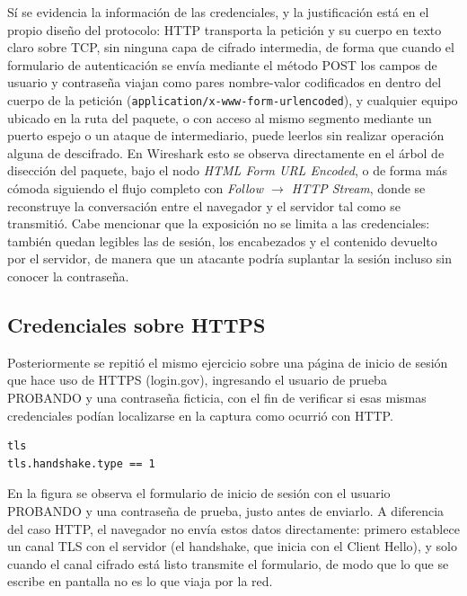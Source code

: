 \begin{respuesta}
Sí se evidencia la información de las credenciales, y la justificación está en el propio diseño del protocolo: HTTP transporta la petición y su cuerpo en texto claro sobre TCP, sin ninguna capa de cifrado intermedia, de forma que cuando el formulario de autenticación se envía mediante el método POST los campos de usuario y contraseña viajan como pares nombre-valor codificados en  dentro del cuerpo de la petición (\texttt{application/x-www-form-urlencoded}), y cualquier equipo ubicado en la ruta del paquete, o con acceso al mismo segmento mediante un puerto espejo o un ataque de intermediario, puede leerlos sin realizar operación alguna de descifrado. En Wireshark esto se observa directamente en el árbol de disección del paquete, bajo el nodo \emph{HTML Form URL Encoded}, o de forma más cómoda siguiendo el flujo completo con \emph{Follow $\rightarrow$ HTTP Stream}, donde se reconstruye la conversación entre el navegador y el servidor tal como se transmitió. Cabe mencionar que la exposición no se limita a las credenciales: también quedan legibles las  de sesión, los encabezados y el contenido devuelto por el servidor, de manera que un atacante podría suplantar la sesión incluso sin conocer la contraseña.
\end{respuesta}

\subsection{Credenciales sobre HTTPS}

Posteriormente se repitió el mismo ejercicio sobre una página de inicio de sesión que hace uso de HTTPS (login.gov), ingresando el usuario de prueba PROBANDO y una contraseña ficticia, con el fin de verificar si esas mismas credenciales podían localizarse en la captura como ocurrió con HTTP.

\begin{lstlisting}
tls
tls.handshake.type == 1
\end{lstlisting}


\begin{analisis}
En la figura se observa el formulario de inicio de sesión con el usuario PROBANDO y una contraseña de prueba, justo antes de enviarlo. A diferencia del caso HTTP, el navegador no envía estos datos directamente: primero establece un canal TLS con el servidor (el handshake, que inicia con el Client Hello), y solo cuando el canal cifrado está listo transmite el formulario, de modo que lo que se escribe en pantalla no es lo que viaja por la red.
\end{analisis}


